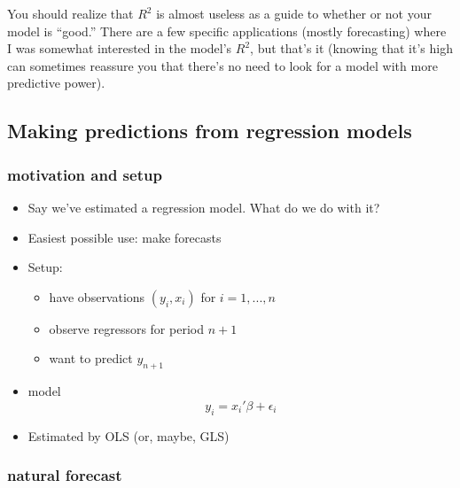 \begin{itemize}[leftmargin=0pt]
  You should realize that $R^2$ is almost useless as a guide to whether
  or not your model is ``good.''  There are a few specific
  applications (mostly forecasting) where I was somewhat interested in
  the model's $R^2$, but that's it (knowing that it's high can
  sometimes reassure you that there's no need to look for a model with
  more predictive power).

\end{itemize}

\subsection{Making predictions from regression models}

\subsubsection{motivation and setup}
\begin{itemize}[leftmargin=0pt]
\item Say we've estimated a regression model.  What do we do with it?
\item Easiest possible use: make forecasts
\item Setup:
\begin{itemize}
\item have observations $(y_i, x_i)$ for $i = 1,...,n$
\item observe regressors for period $n+1$
\item want to predict $y_{n+1}$
\end{itemize}
\item model \[ y_i = x_i'\beta + \epsilon_i \]
\item Estimated by OLS (or, maybe, GLS)
\end{itemize}

\subsubsection{natural forecast}

